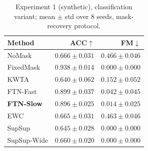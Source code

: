 \begin{table}[t]
\caption{Experiment 1 (synthetic), classification variant; mean $\pm$ std over 8 seeds, mask-recovery protocol.}
\label{tab:exp1clf}
\vskip 0.05in
\begin{center}\begin{small}\begin{sc}
\begin{tabular}{lrr}
\toprule
Method & ACC$\uparrow$ & FM$\downarrow$ \\
\midrule
NoMask & $0.666\pm0.031$ & $0.466\pm0.046$ \\
FixedMask & $0.938\pm0.014$ & $0.000\pm0.000$ \\
KWTA & $0.640\pm0.062$ & $0.152\pm0.052$ \\
FTN-Fast & $0.899\pm0.037$ & $0.042\pm0.045$ \\
\textbf{FTN-Slow} & $0.896\pm0.025$ & $0.014\pm0.025$ \\
EWC & $0.665\pm0.031$ & $0.463\pm0.046$ \\
SupSup & $0.645\pm0.028$ & $0.000\pm0.000$ \\
SupSup-Wide & $0.660\pm0.020$ & $0.000\pm0.000$ \\
\bottomrule
\end{tabular}
\end{sc}\end{small}\end{center}
\vskip -0.1in
\end{table}
